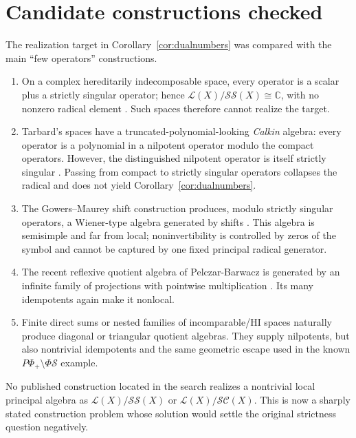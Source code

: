 \documentclass[11pt]{article}
\theoremstyle{definition}
\newcommand{\Lop}{\mathcal L}
\newcommand{\SSing}{\mathcal{SS}}
\newcommand{\SCos}{\mathcal{SC}}
\newcommand{\PhiS}{\Phi\mathcal S}
\newcommand{\PPhiP}{P\Phi_+}
\begin{document}
\section{Candidate constructions checked}

The realization target in Corollary~\ref{cor:dualnumbers} was compared with the main
``few operators'' constructions.

\begin{enumerate}[leftmargin=2em]
\item On a complex hereditarily indecomposable space, every operator is a scalar plus a
strictly singular operator; hence \(\Lop(X)/\SSing(X)\cong\mathbb C\), with no nonzero
radical element \cite{Ferenczi1997}.  Such spaces therefore cannot realize the target.

\item Tarbard's spaces have a truncated-polynomial-looking \emph{Calkin} algebra: every
operator is a polynomial in a nilpotent operator modulo the compact operators.  However,
the distinguished nilpotent operator is itself strictly singular \cite{Tarbard2012}.  Passing
from compact to strictly singular operators collapses the radical and does not yield
Corollary~\ref{cor:dualnumbers}.

\item The Gowers--Maurey shift construction produces, modulo strictly singular operators,
a Wiener-type algebra generated by shifts \cite{GM1997}.  This algebra is semisimple and
far from local; noninvertibility is controlled by zeros of the symbol and cannot be captured
by one fixed principal radical generator.

\item The recent reflexive quotient algebra of Pelczar-Barwacz is generated by an infinite
family of projections with pointwise multiplication \cite{PB2024}.  Its many idempotents
again make it nonlocal.

\item Finite direct sums or nested families of incomparable/HI spaces naturally produce
diagonal or triangular quotient algebras.  They supply nilpotents, but also nontrivial
idempotents and the same geometric escape used in the known
\(\PPhiP\setminus\PhiS\) example.
\end{enumerate}

No published construction located in the search realizes a nontrivial local principal
algebra as \(\Lop(X)/\SSing(X)\) or \(\Lop(X)/\SCos(X)\).  This is now a sharply stated
construction problem whose solution would settle the original strictness question
negatively.
\end{document}
